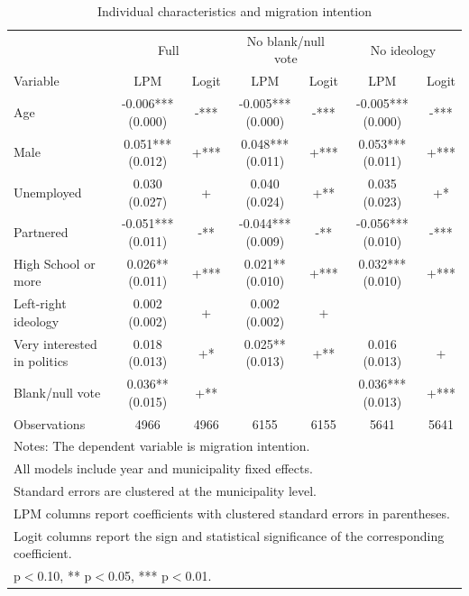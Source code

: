 \begin{table}[!htbp]
\centering
\caption{Individual characteristics and migration intention}
\label{tab:individual_characteristics_specs}
\small
\begin{tabular}{lcccccc}
\hline
 & \multicolumn{2}{c}{Full} & \multicolumn{2}{c}{No blank/null vote} & \multicolumn{2}{c}{No ideology} \\
Variable & LPM & Logit & LPM & Logit & LPM & Logit \\
\hline
Age & -0.006*** (0.000) & -*** & -0.005*** (0.000) & -*** & -0.005*** (0.000) & -*** \\
Male & 0.051*** (0.012) & +*** & 0.048*** (0.011) & +*** & 0.053*** (0.011) & +*** \\
Unemployed & 0.030 (0.027) & + & 0.040 (0.024) & +** & 0.035 (0.023) & +* \\
Partnered & -0.051*** (0.011) & -** & -0.044*** (0.009) & -** & -0.056*** (0.010) & -*** \\
High School or more & 0.026** (0.011) & +*** & 0.021** (0.010) & +*** & 0.032*** (0.010) & +*** \\
Left-right ideology & 0.002 (0.002) & + & 0.002 (0.002) & + &  &  \\
Very interested in politics & 0.018 (0.013) & +* & 0.025** (0.013) & +** & 0.016 (0.013) & + \\
Blank/null vote & 0.036** (0.015) & +** &  &  & 0.036*** (0.013) & +*** \\
\hline
Observations & 4966 & 4966 & 6155 & 6155 & 5641 & 5641 \\
\hline
\multicolumn{7}{l}{\footnotesize Notes: The dependent variable is migration intention.} \\
\multicolumn{7}{l}{\footnotesize All models include year and municipality fixed effects.} \\
\multicolumn{7}{l}{\footnotesize Standard errors are clustered at the municipality level.} \\
\multicolumn{7}{l}{\footnotesize LPM columns report coefficients with clustered standard errors in parentheses.} \\
\multicolumn{7}{l}{\footnotesize Logit columns report the sign and statistical significance of the corresponding coefficient.} \\
\multicolumn{7}{l}{\footnotesize * p$<$0.10, ** p$<$0.05, *** p$<$0.01.} \\
\end{tabular}
\end{table}
